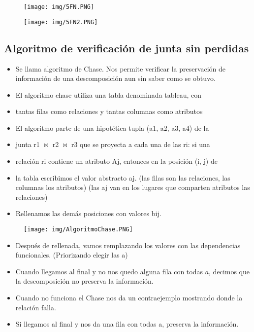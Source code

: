 \begin{figure}[!htb]
    \centering
    \texttt{[image: img/5FN.PNG]}
\end{figure}

\begin{figure}[!htb]
    \centering
    \texttt{[image: img/5FN2.PNG]}
\end{figure}


\newpage
\subsection*{Algoritmo de verificación de junta sin perdidas}
\begin{itemize}
\item Se llama algoritmo de Chase. Nos permite verificar la preservación de información de una descomposición aun sin saber como se obtuvo.
\item El algoritmo chase utiliza una tabla denominada tableau, con
\item tantas filas como relaciones y tantas columnas como atributos
\item El algoritmo parte de una hipotética tupla (a1, a2, a3, a4) de la
\item junta r1 $\bowtie$ r2 $\bowtie$ r3 que se proyecta a cada una de las ri: si una
\item relación ri contiene un atributo Aj, entonces en la posición (i, j) de
\item la tabla escribimos el valor abstracto aj. (las filas son las relaciones, las columnas los atributos) (las aj van en los lugares que comparten atributos las relaciones)
\item Rellenamos las demás posiciones con valores bij.
\end{itemize}


\begin{figure}[!htb]
    \centering
    \texttt{[image: img/AlgoritmoChase.PNG]}
\end{figure}

\begin{itemize}
\item Después de rellenada, vamos remplazando los valores con las dependencias funcionales. (Priorizando elegir las a)
\item Cuando llegamos al final y no nos quedo alguna fila con todas $a$, decimos que la descomposición no preserva la información.
\item Cuando no  funciona el Chase nos da un contraejemplo mostrando donde la relación falla.
\item Si llegamos al final y nos da una fila con todas a, preserva la información.
\end{itemize}


\newpage